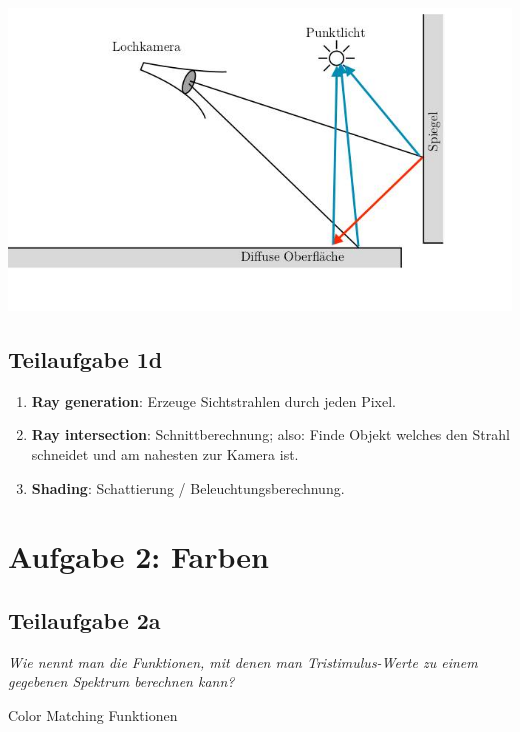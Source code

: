 \documentclass[a4paper]{scrartcl}
\begin{document}
\includegraphics*[width=\linewidth, keepaspectratio]{1c.jpg}

\subsection*{Teilaufgabe 1d}
\begin{enumerate}
    \item \textbf{Ray generation}: Erzeuge Sichtstrahlen durch jeden Pixel.
    \item \textbf{Ray intersection}: Schnittberechnung; also: Finde Objekt
          welches den Strahl schneidet und am nahesten zur Kamera ist.
    \item \textbf{Shading}: Schattierung / Beleuchtungsberechnung.
\end{enumerate}

\section*{Aufgabe 2: Farben}
\subsection*{Teilaufgabe 2a}
\textit{Wie nennt man die Funktionen, mit denen man Tristimulus-Werte zu einem gegebenen Spektrum berechnen kann?}

Color Matching Funktionen
\end{document}
